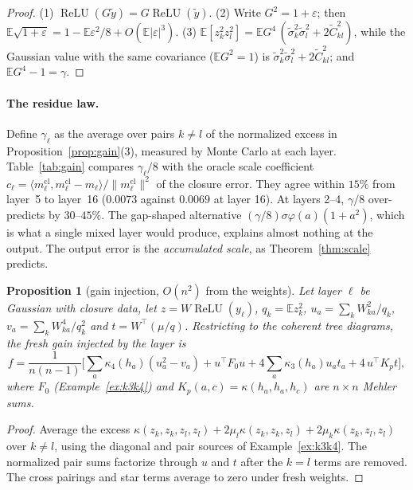 \documentclass[11pt]{article}
\newtheorem{proposition}[theorem]{Proposition}
\theoremstyle{definition}
\theoremstyle{remark}
\newcommand{\E}{\mathbb E}
\newcommand{\relu}{\operatorname{ReLU}}
\begin{document}
\begin{proof}
(1) $\relu(G\tilde y)=G\relu(\tilde y)$. (2) Write $G^2=1+\varepsilon$; then $\E\sqrt{1+\varepsilon}=1-\E\varepsilon^2/8+O(\E|\varepsilon|^3)$. (3) $\E[z_k^2z_l^2]=\E G^4\,(\tilde\sigma_k^2\tilde\sigma_l^2+2\tilde C_{kl}^2)$, while the Gaussian value with the same covariance ($\E G^2=1$) is $\tilde\sigma_k^2\tilde\sigma_l^2+2\tilde C_{kl}^2$; and $\E G^4-1=\gamma$.
\end{proof}

\paragraph{The residue law.} Define $\gamma_\ell$ as the average over pairs $k\ne l$ of the normalized excess in Proposition~\ref{prop:gain}(3), measured by Monte Carlo at each layer. Table~\ref{tab:gain} compares $\gamma_\ell/8$ with the oracle scale coefficient $c_\ell=\langle m^{\mathrm{cl}}_\ell,m^{\mathrm{cl}}_\ell-m_\ell\rangle/\|m^{\mathrm{cl}}_\ell\|^2$ of the closure error. They agree within $15\%$ from layer~5 to layer~16 ($0.0073$ against $0.0069$ at layer 16). At layers 2--4, $\gamma/8$ over-predicts by $30$--$45\%$. The gap-shaped alternative $(\gamma/8)\sigma\varphi(a)(1+a^2)$, which is what a single mixed layer would produce, explains almost nothing at the output. The output error is the \emph{accumulated scale}, as Theorem~\ref{thm:scale} predicts.

\begin{proposition}[gain injection, $O(n^2)$ from the weights]\label{prop:inject}
Let layer $\ell$ be Gaussian with closure data, let $z=W\relu(y_\ell)$, $q_k=\E z_k^2$, $u_a=\sum_kW_{ka}^2/q_k$, $v_a=\sum_kW_{ka}^4/q_k^2$ and $t=W^\top(\mu/q)$. Restricting to the coherent tree diagrams, the fresh gain injected by the layer is
\[
f=\frac{1}{n(n-1)}\Big[\sum_a\kappa_4(h_a)(u_a^2-v_a)+u^\top F_0u+4\sum_a\kappa_3(h_a)u_at_a+4\,u^\top K_pt\Big],
\]
where $F_0$ (Example~\ref{ex:k3k4}) and $K_p(a,c)=\kappa(h_a,h_a,h_c)$ are $n\times n$ Mehler sums.
\end{proposition}

\begin{proof}
Average the excess $\kappa(z_k,z_k,z_l,z_l)+2\mu_l\kappa(z_k,z_k,z_l)+2\mu_k\kappa(z_k,z_l,z_l)$ over $k\ne l$, using the diagonal and pair sources of Example~\ref{ex:k3k4}. The normalized pair sums factorize through $u$ and $t$ after the $k=l$ terms are removed. The cross pairings and star terms average to zero under fresh weights.
\end{proof}
\end{document}
